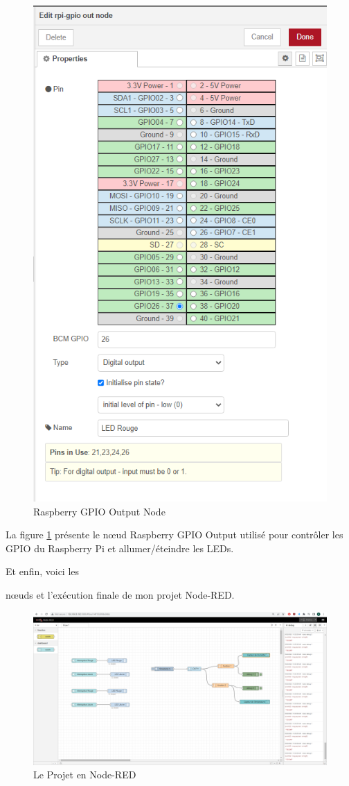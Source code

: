 \begin{figure}[H]
\centering
\includegraphics[width=12cm]{Images/Node-7.png}
\caption{Raspberry GPIO Output Node}
\label{Chap4.3.19}
\end{figure}

La figure \ref{Chap4.3.19} présente le nœud Raspberry GPIO Output utilisé pour contrôler les GPIO du Raspberry Pi et allumer/éteindre les LEDs.

Et enfin, voici les

 nœuds et l'exécution finale de mon projet Node-RED.

\begin{figure}[H]
\centering
\includegraphics[width=15cm]{Images/Node-1.png}
\caption{Le Projet en Node-RED}
\label{Chap4.3.20}
\end{figure}

